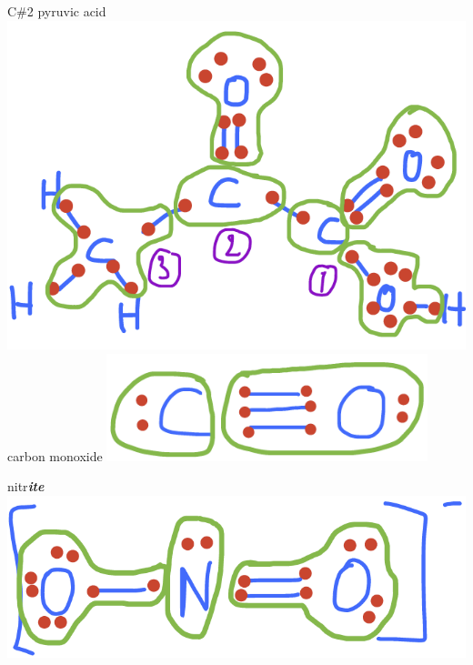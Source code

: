 \documentclass[]{book}
\theoremstyle{definition}
\theoremstyle{definition}
\theoremstyle{definition}
\theoremstyle{remark}
\begin{document}
C\#2 pyruvic acid~\includegraphics{pictures/ElecAlloc_pyruvic_acid.png}
carbon monoxide
\includegraphics[width=0.70000\textwidth]{pictures/ElecAlloc_CO.png}

nitr\emph{\textbf{ite}}~\includegraphics{pictures/ElecAlloc_NO2-.png}
\end{document}
